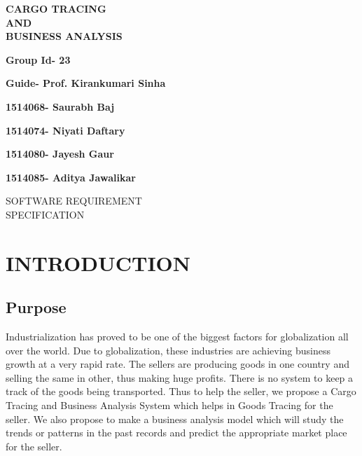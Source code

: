 \documentclass{scrreprt}
\date{}
\begin{document}
    \begin{center}
        \Huge{ \textbf{ CARGO TRACING \\ AND \\ BUSINESS ANALYSIS} }
    
   
      \textbf{
     \Huge{ \newline \newline \newline  \newline    Group Id- 23 }  }
     
     \textbf{
     \Huge{ \newline  Guide- Prof. Kirankumari Sinha \newline} }
     
     \textbf{
     \Huge{ 1514068- Saurabh Baj} }
     
     \textbf{
     \Huge{  1514074- Niyati Daftary} }
     
     \textbf{
     \Huge{ 1514080- Jayesh Gaur} }
     
     \textbf{
     \Huge{ 1514085- Aditya Jawalikar} }
     
     \end{center}
     
   
    \newpage
    
    \begin{flushright}
	\newline \newline 
    \begin{bfseries}
        \Huge{ SOFTWARE REQUIREMENT\\ SPECIFICATION}\\
        \vspace{1.9cm}
    
    \end{bfseries}
\end{flushright}
\newpage
\tableofcontents
\newpage


\chapter{INTRODUCTION  \newline }

\section{Purpose}
Industrialization has proved to be one of the biggest factors for globalization all over the world. Due to globalization, these industries are achieving business growth at a very rapid rate. The sellers are producing goods in one country and selling the same in other, thus making huge profits. There is no system to keep a track of the goods being transported. Thus to help the seller, we propose a Cargo Tracing and Business Analysis System which helps in Goods Tracing for the seller. We also propose to make a business analysis model which will study the trends or patterns in the past records and predict the appropriate market place for the seller.
\newline \newline
 
\end{document}
